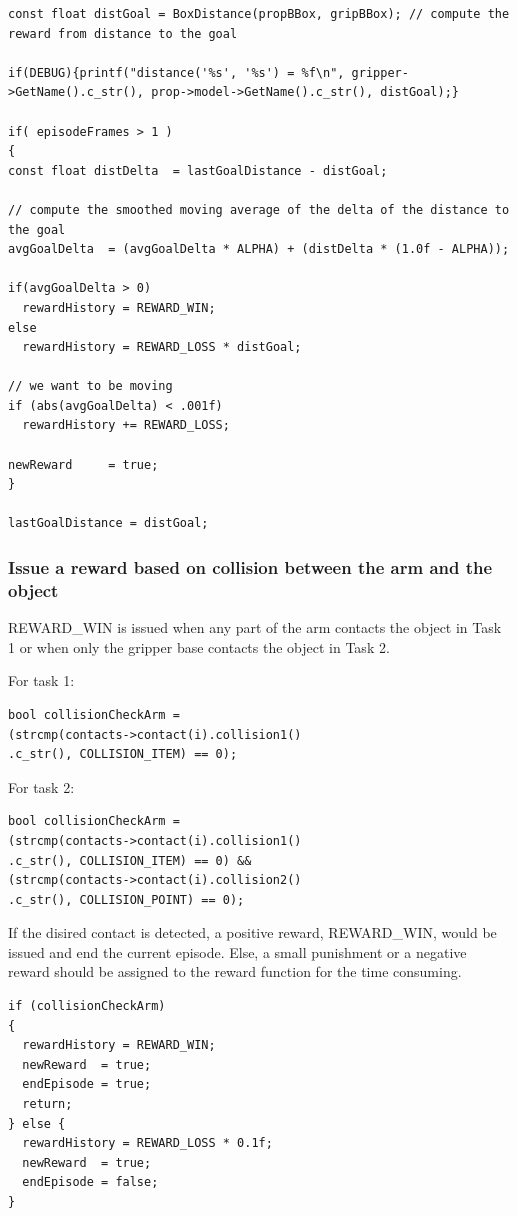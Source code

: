 \documentclass[10pt,journal,compsoc]{IEEEtran}
\begin{document}
\begin{lstlisting}
const float distGoal = BoxDistance(propBBox, gripBBox); // compute the reward from distance to the goal

if(DEBUG){printf("distance('%s', '%s') = %f\n", gripper->GetName().c_str(), prop->model->GetName().c_str(), distGoal);}

if( episodeFrames > 1 )
{
const float distDelta  = lastGoalDistance - distGoal;

// compute the smoothed moving average of the delta of the distance to the goal
avgGoalDelta  = (avgGoalDelta * ALPHA) + (distDelta * (1.0f - ALPHA));

if(avgGoalDelta > 0)
  rewardHistory = REWARD_WIN;
else
  rewardHistory = REWARD_LOSS * distGoal;

// we want to be moving
if (abs(avgGoalDelta) < .001f)
  rewardHistory += REWARD_LOSS;

newReward     = true;
}

lastGoalDistance = distGoal;
\end{lstlisting}

\subsubsection{Issue a reward based on collision between the arm and the object}

REWARD\_WIN is issued when any part of the arm contacts the object in Task 1 or when only the gripper base contacts the object in Task 2.

For task 1:

\begin{lstlisting}
bool collisionCheckArm = 
(strcmp(contacts->contact(i).collision1()
.c_str(), COLLISION_ITEM) == 0);
\end{lstlisting}

For task 2:

\begin{lstlisting}
bool collisionCheckArm = 
(strcmp(contacts->contact(i).collision1()
.c_str(), COLLISION_ITEM) == 0) && 
(strcmp(contacts->contact(i).collision2()
.c_str(), COLLISION_POINT) == 0);
\end{lstlisting}

If the disired contact is detected, a positive reward, REWARD\_WIN, would be issued and end the current episode. Else, a small punishment or a negative reward should be assigned to the reward function for the time consuming.

\begin{lstlisting}
if (collisionCheckArm)
{
  rewardHistory = REWARD_WIN;
  newReward  = true;
  endEpisode = true;
  return;
} else {
  rewardHistory = REWARD_LOSS * 0.1f;
  newReward  = true;
  endEpisode = false;
}
\end{lstlisting}
\end{document}
